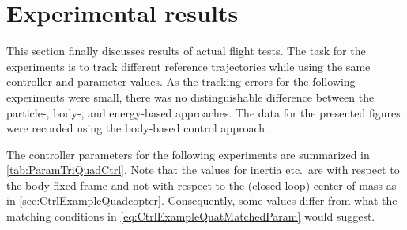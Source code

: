 \section{Experimental results}
This section finally discusses results of actual flight tests.
The task for the experiments is to track different reference trajectories while using the same controller and parameter values.
As the tracking errors for the following experiments were small, there was no distinguishable difference between the particle-, body-, and energy-based approaches.
The data for the presented figures were recorded using the body-based control approach.

The controller parameters for the following experiments are summarized in \autoref{tab:ParamTriQuadCtrl}.
Note that the values for inertia etc.\ are with respect to the body-fixed frame and not with respect to the (closed loop) center of mass as in \autoref{sec:CtrlExampleQuadcopter}.
Consequently, some values differ from what the matching conditions in \eqref{eq:CtrlExampleQuatMatchedParam} would suggest.

